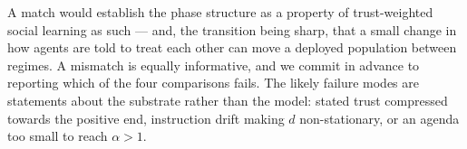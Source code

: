 


A match would establish the phase structure as a property of trust-weighted social
learning as such --- and, the transition being sharp, that a small change in how
agents are told to treat each other can move a deployed population between regimes.
A mismatch is equally informative, and we commit in advance to reporting which of
the four comparisons fails. The likely failure modes are statements about the
substrate rather than the model: stated trust compressed towards the positive end,
instruction drift making $d$ non-stationary, or an agenda too small to reach
$\alpha>1$.
